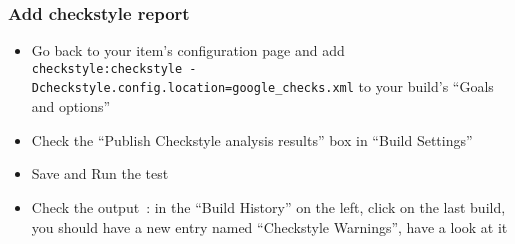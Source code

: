 \documentclass{article}
\begin{document}
\subsubsection{Add checkstyle report}
\begin{itemize}
\item Go back to your item's configuration page and add \\
\texttt{checkstyle:checkstyle -Dcheckstyle.config.location=google\_checks.xml} to your build's ``Goals and options''
\item Check the ``Publish Checkstyle analysis results'' box in ``Build Settings''
\item Save and Run the test
\item Check the output~: in the ``Build History'' on the left, click on the last build, you should have a new entry named ``Checkstyle Warnings'', have a look at it
\end{itemize}

\clearpage
\end{document}
